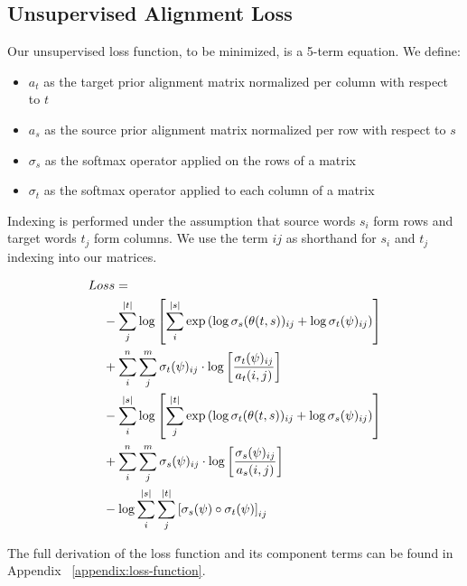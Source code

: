 \documentclass[twoside,twocolumn]{article}
\begin{document}
\subsection{Unsupervised Alignment Loss}


Our unsupervised loss function, to be minimized, is a 5-term equation.
We define:
\begin{itemize}[label={}]
  \item $a_t$ as the target prior alignment matrix normalized per column with respect to $t$\\ %
  \item $a_s$ as the source prior alignment matrix normalized per row with respect to $s$\\ %
  \item $\sigma_s$ as the softmax operator applied on the rows of a matrix\\
  \item $\sigma_t$ as the softmax operator applied to each column of a matrix
\end{itemize}

Indexing is performed under the assumption that source words $s_i$ form rows
and target words $t_j$ form columns. We use the term $ij$ as shorthand
for $s_i$ and $t_j$ indexing into our matrices.

\begin{equation}
  \centering
\begin{split}
  Lo&ss = \\
  &- \sum_j^{|t|} \log \left[
      \sum_i^{|s|} \exp \left(
        \log \sigma_s(\theta(t, s))_{ij} + \log \sigma_t(\psi)_{ij} \right)
    \right] \\
  &+ \sum_i^n \sum_j^m \sigma_t(\psi)_{ij} \cdot \log \left[
    \frac{\sigma_t(\psi)_{ij}}{a_t(i, j)} \right] \\
  &- \sum_i^{|s|} \log \left[ \sum_j^{|t|}
      \exp \left(
        \log \sigma_t(\theta(t, s))_{ij} + \log \sigma_s(\psi)_{ij}
      \right)
    \right] \\
  &+ \sum_i^n \sum_j^m \sigma_s(\psi)_{ij} \cdot \log \left[
    \frac{\sigma_s(\psi)_{ij}}{a_s(i, j)} \right] \\
  &- \log \sum_i^{|s|} \sum_j^{|t|} \left[
    \sigma_s(\psi) \circ \sigma_t(\psi) \right]_{ij} \\
\end{split}
\end{equation}

The full derivation of the loss function and its component terms can be found
in Appendix ~\ref{appendix:loss-function}.
\end{document}
